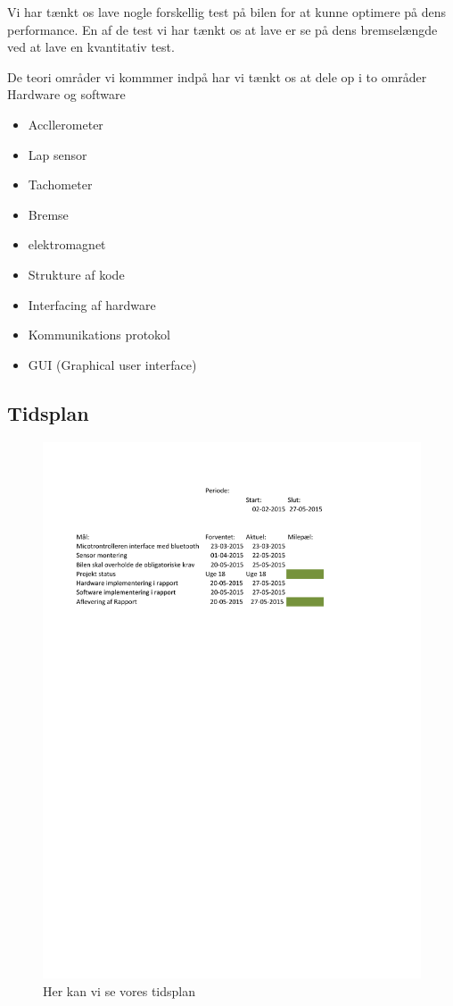 Vi har tænkt os lave nogle forskellig test på bilen for at kunne optimere på dens performance. En af de test vi har tænkt os at lave er se på dens bremselængde ved at lave en kvantitativ test.

De teori områder vi kommmer indpå har vi tænkt os at dele op i to områder Hardware og software

\item[Hardware] \hfill
		\begin{itemize}
			\item Accllerometer
			\item Lap sensor
			\item Tachometer
			\item Bremse
			\item elektromagnet
		\end{itemize}
		
\item[Software] \hfill
		\begin{itemize}
			\item Strukture af kode
			\item Interfacing af hardware
			\item Kommunikations protokol
			\item GUI (Graphical user interface)
		\end{itemize}
 

\subsection{Tidsplan}

\begin{figure}[h]
	\centering
		\includegraphics[scale=1]{Billeder/tidsplan.pdf}
	\caption{Her kan vi se vores tidsplan}
	\label{fig:tidsplan}
\end{figure}